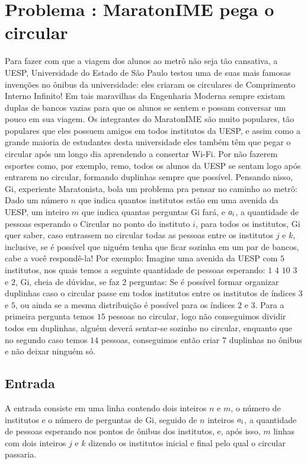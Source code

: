 \section*{Problema \proxLetra: MaratonIME pega o circular}

Para fazer com que a viagem dos alunos ao metrô não seja tão cansativa, a UESP, Universidade do Estado de São Paulo testou uma de suas mais famosas invenções no ônibus da universidade: eles criaram os circulares de Comprimento Interno Infinito! Em tais maravilhas da Engenharia Moderna sempre existam duplas de bancos vazias para que os alunos se sentem e possam conversar um pouco em sua viagem. 
Os integrantes do MaratonIME são muito populares, tão populares que eles possuem amigos em todos institutos da UESP, e assim como a grande maioria de estudantes desta universidade eles também têm que pegar o circular após um longo dia aprendendo a consertar Wi-Fi. Por não fazerem esportes como, por exemplo, remo, todos os alunos da UESP se sentam logo após entrarem no circular, formando duplinhas sempre que possível. Pensando nisso, Gi, experiente Maratonista, bola um problema pra pensar no caminho ao metrô: Dado um número $n$ que indica quantos institutos estão em uma avenida da UESP, um inteiro $m$ que indica quantas perguntas Gi fará, e $a\textsubscript{i}$, a quantidade de pessoas esperando o Circular no ponto do instituto $i$, para todos os institutos, Gi quer saber, caso entrassem no circular todas as pessoas entre os institutos $j$ e $k$, inclusive, se é possível que niguém tenha que ficar sozinha em um par de bancos, cabe a você respondê-la! 
Por exemplo: Imagine uma avenida da UESP com $5$ institutos, nos quais temos a seguinte quantidade de pessoas esperando: $1$ $4$ $10$ $3$ e $2$, Gi, cheia de dúvidas, se faz $2$ perguntas: Se é possível formar organizar duplinhas caso o circular passe em todos institutos entre os institutos de índices $3$ e $5$, ou ainda se a mesma distribuição é possível para os índices $2$ e $3$. Para a primeira pergunta temos $15$ pessoas no circular, logo não conseguimos dividir todos em duplinhas, alguém deverá sentar-se sozinho no circular, enquanto que no segundo caso temos $14$ pessoas, conseguimos então criar $7$ duplinhas no ônibus e não deixar ninguém só.

\subsection*{Entrada}
\textoDiversasInstanciasEOF

A entrada consiste em uma linha contendo dois inteiros $n$ e $m$, o número de institutos e o número de perguntas de Gi, seguido de $n$ inteiros $a\textsubscript{i}$, a quantidade de pessoas esperando nos pontos de ônibus dos institutos, e, após isso, $m$ linhas com dois inteiros $j$ e $k$ dizendo os institutos inicial e final pelo qual o circular passaria.


